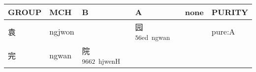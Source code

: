 \documentclass[14pt,a4paper]{scrartcl}
\begin{document}
\begin{longtable}[c]{@{}llllll@{}}
\toprule
\begin{minipage}[b]{0.14\columnwidth}\raggedright\strut
GROUP
\strut\end{minipage} &
\begin{minipage}[b]{0.14\columnwidth}\raggedright\strut
MCH
\strut\end{minipage} &
\begin{minipage}[b]{0.14\columnwidth}\raggedright\strut
B
\strut\end{minipage} &
\begin{minipage}[b]{0.14\columnwidth}\raggedright\strut
A
\strut\end{minipage} &
\begin{minipage}[b]{0.14\columnwidth}\raggedright\strut
none
\strut\end{minipage} &
\begin{minipage}[b]{0.14\columnwidth}\raggedright\strut
PURITY
\strut\end{minipage}\tabularnewline
\midrule
\endhead
\begin{minipage}[t]{0.14\columnwidth}\raggedright\strut
袁
\strut\end{minipage} &
\begin{minipage}[t]{0.14\columnwidth}\raggedright\strut
ngjwon
\strut\end{minipage} &
\begin{minipage}[t]{0.14\columnwidth}\raggedright\strut
\strut\end{minipage} &
\begin{minipage}[t]{0.14\columnwidth}\raggedright\strut
园\textsuperscript{56ed~ngwan}
\strut\end{minipage} &
\begin{minipage}[t]{0.14\columnwidth}\raggedright\strut
\strut\end{minipage} &
\begin{minipage}[t]{0.14\columnwidth}\raggedright\strut
pure:A
\strut\end{minipage}\tabularnewline
\begin{minipage}[t]{0.14\columnwidth}\raggedright\strut
完
\strut\end{minipage} &
\begin{minipage}[t]{0.14\columnwidth}\raggedright\strut
ngwan
\strut\end{minipage} &
\begin{minipage}[t]{0.14\columnwidth}\raggedright\strut
院\textsuperscript{9662~hjwenH}
\strut\end{minipage} &

\end{longtable}
\end{document}
